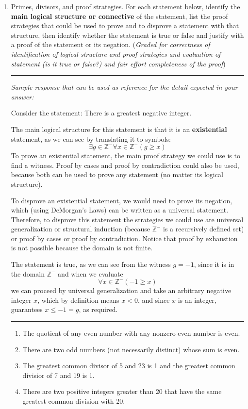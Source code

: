 \begin{enumerate}[labelindent=0pt, leftmargin=0pt]
    \item Primes, divisors, and proof strategies. For each statement below, identify the {\bf main logical structure or connective} of the 
    statement, list the proof strategies that could be used to prove and to disprove a statement with that structure, 
    then identify whether the statement is true or false and justify with a proof of the statement or its negation. 
    ({\it Graded for correctness of identification of logical structure and proof strategies and evaluation of statement (is it true or false?) 
    and fair effort completeness of the proof}) 


    \rule{0.5\textwidth}{.4pt}
    
    {\it Sample response that can be used as reference for the detail expected 
    in your answer:} 

    Consider the statement: There is a greatest negative integer.

    The main logical structure for this statement is that it is an {\bf existential} statement, as we can 
    see by translating it to symbols: 
    \[
        \exists g \in \mathbb{Z}^{-} \forall x \in \mathbb{Z}^{-} ( g \geq x)
    \]
    To prove an existential statement, the main proof strategy we could use is to find a witness. 
    Proof by cases and proof by contradiction could also be used, because 
    both can be used to prove any statement (no matter its logical structure).

    To disprove an existential statement, we would need to prove its negation, which (using DeMorgan's Laws) can be 
    written as a universal statement. Therefore, to disprove this statement the strategies we could use are 
    universal generalization or structural induction (because $\mathbb{Z}^{-}$ is a recursively defined set) or 
    proof by cases or proof by contradiction. Notice that proof by exhaustion is not possible because the domain is not finite.

    The statement is true, as we can see from the witness $g = -1$, since it is in the domain $\mathbb{Z}^{-}$ and when we evaluate
    \[
        \forall x \in \mathbb{Z}^{-} ( -1 \geq x)
    \]
    we can proceed by universal generalization and take an arbitrary negative integer $x$, which by definition means $x < 0$, 
    and since $x$ is an integer, guarantees $x \leq -1 = g$, as required.
    \rule{0.5\textwidth}{.4pt}

        \begin{enumerate}
            \item The quotient of any even number with any nonzero even number is even.
            \item There are two odd numbers (not necessarily distinct) whose sum is even.
            \item The greatest common divisor of 5 and 23 is 1 and the greatest common divisior of 7 and 19 is 1.
            \item There are two positive integers greater than 20 that have the same greatest common division with 20.
        \end{enumerate}
    \end{enumerate}

